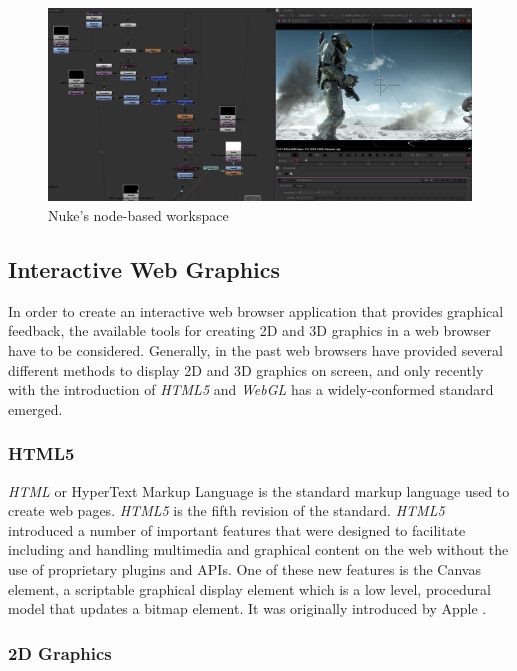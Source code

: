 \documentclass[a4paper,11pt,titlepage]{article}
\begin{document}
\begin{figure}[ht!]
\centering
\includegraphics[width=170mm]{graphics/nuke_02.png}
\caption{Nuke's node-based workspace}
\label{fig:UIdesign1}
\end{figure}


\subsection{Interactive Web Graphics}

In order to create an interactive web browser application that provides graphical feedback, the available tools for creating 2D and 3D graphics in a web browser have to be considered. Generally, in the past web browsers have provided several different methods to display 2D and 3D graphics on screen, and only recently with the introduction of \textit{HTML5} and \textit{WebGL} has a widely-conformed standard emerged.

\subsubsection{HTML5}

\textit{HTML} or HyperText Markup Language is the standard markup language used to create web pages. \textit{HTML5} is the fifth revision of the standard. \textit{HTML5} introduced a number of important features that were designed to facilitate including and handling multimedia and graphical content on the web without the use of proprietary plugins and APIs. One of these new features is the Canvas element, a scriptable graphical display element which is a low level, procedural model that updates a bitmap element. It was originally introduced by Apple \cite{canvas} .

\subsubsection{2D Graphics}
\end{document}
